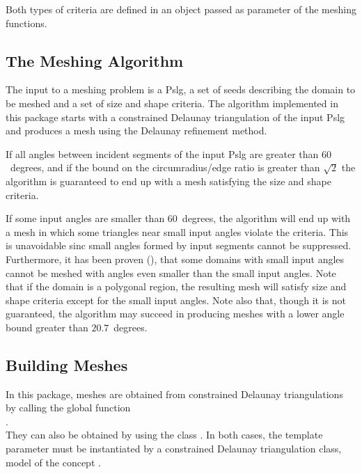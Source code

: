 Both types of criteria are defined in an object  passed as
parameter of the meshing functions.

\subsection{The Meshing Algorithm}

The input to a meshing problem is a {\sc Pslg}, a set of seeds
describing the domain to be meshed and a set of size and shape
criteria.  The algorithm implemented in this package starts with a
constrained Delaunay triangulation of the input {\sc Pslg} and produces a
mesh using the Delaunay refinement method.

If all angles between incident segments of the input {\sc Pslg}
are greater than $60$~degrees, and if the bound on the
circumradius/edge ratio is greater than $\sqrt{2}$
the algorithm is guaranteed to end up with a mesh
satisfying the size and shape criteria.

If some input angles are smaller than $60$~degrees, the algorithm will
end up with a mesh in which some triangles near small input angles
violate the criteria.  This is unavoidable sinc small angles formed
by input segments cannot be suppressed. Furthermore, it has been
proven (\cite{s-mgdsa-00}), that some domains with small input angles
cannot be meshed with angles even smaller than the small input angles.
Note that if the domain is a polygonal region, the resulting mesh will
satisfy size and shape criteria except for the small input angles.
Note also that, though it is not guaranteed, the algorithm may succeed
in producing meshes with a lower angle bound greater than
$20.7$~degrees.

\subsection{Building Meshes}
\label{sec:Mesh_2_building_meshes}

In this package, meshes are obtained from
constrained Delaunay triangulations by calling the global function \\
. \\
They can also be obtained by using the class .
In both cases, the template parameter  must be instantiated by a
constrained Delaunay triangulation class, model of the concept
.

